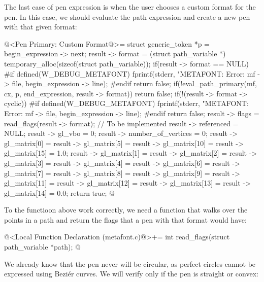 The last case of pen expression is when the user chooses a custom
format for the pen. In this case, we should evaluate the path
expression and create a new pen with that given format:

\iniciocodigo
@<Pen Primary: Custom Format@>=
struct generic_token *p = begin_expression -> next;
result -> format =
        (struct path_variable *) temporary_alloc(sizeof(struct path_variable));
if(result -> format == NULL){
#if defined(W_DEBUG_METAFONT)
  fprintf(stderr, "METAFONT: Error: %
          mf -> file, begin_expression -> line);
#endif
  return false;
}
if(!eval_path_primary(mf, cx, p, end_expression, result -> format))
  return false;
if(!(result -> format -> cyclic)){
#if defined(W_DEBUG_METAFONT)
  fprintf(stderr,
          "METAFONT: Error: %
          mf -> file, begin_expression -> line);
#endif
  return false;
}
result -> flags = read_flags(result -> format); // To be implemented
result -> referenced = NULL;
result -> gl_vbo = 0;
result -> number_of_vertices = 0;
result -> gl_matrix[0] = result -> gl_matrix[5] = result -> gl_matrix[10] =
                         result -> gl_matrix[15] = 1.0; 
result -> gl_matrix[1] = result -> gl_matrix[2] = result -> gl_matrix[3] = 
                         result -> gl_matrix[4] = result -> gl_matrix[6] =
                         result -> gl_matrix[7] = result -> gl_matrix[8] = 
                         result -> gl_matrix[9] = result -> gl_matrix[11] =
                         result -> gl_matrix[12] = result -> gl_matrix[13] =
                         result -> gl_matrix[14] = 0.0;
return true;
@
\fimcodigo

To the functioon above work correctly, we need a function that walks
over the points in a path and return the flags that a pen with that
format would have:

\iniciocodigo
@<Local Function Declaration (metafont.c)@>+=
int read_flags(struct path_variable *path);
@
\fimcodigo

We already know that the pen never will be circular, as perfect
circles cannot be expressed using Beziér curves. We will verify only
if the pen is straight or convex:

